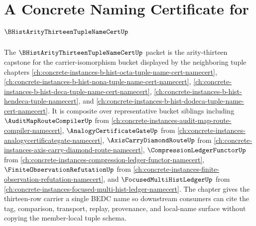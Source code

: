 \chapter{A Concrete Naming Certificate for $\BHistArityThirteenTupleNameCertUp$}
\label{ch:concrete-instances-b-hist-arity13-tuple-namecert}

The $\BHistArityThirteenTupleNameCertUp$ packet is the arity-thirteen capstone for the carrier-isomorphism bucket displayed by the neighboring tuple chapters \autoref{ch:concrete-instances-b-hist-octa-tuple-name-cert-namecert}, \autoref{ch:concrete-instances-b-hist-nona-tuple-name-cert-namecert}, \autoref{ch:concrete-instances-b-hist-deca-tuple-name-cert-namecert}, \autoref{ch:concrete-instances-b-hist-hendeca-tuple-namecert}, and \autoref{ch:concrete-instances-b-hist-dodeca-tuple-name-cert-namecert}. It is composite over representative bucket siblings including $\AuditMapRouteCompilerUp$ from \autoref{ch:concrete-instances-audit-map-route-compiler-namecert}, $\AnalogyCertificateGateUp$ from \autoref{ch:concrete-instances-analogycertificategate-namecert}, $\AxisCarryDiamondRouteUp$ from \autoref{ch:concrete-instances-axis-carry-diamond-route-namecert}, $\CompressionLedgerFunctorUp$ from \autoref{ch:concrete-instances-compression-ledger-functor-namecert}, $\FiniteObservationRefutationUp$ from \autoref{ch:concrete-instances-finite-observation-refutation-namecert}, and $\FocusedMultiHistLedgerUp$ from \autoref{ch:concrete-instances-focused-multi-hist-ledger-namecert}. The chapter gives the thirteen-row carrier a single BEDC name so downstream consumers can cite the tag, comparison, transport, replay, provenance, and local-name surface without copying the member-local tuple schema.

